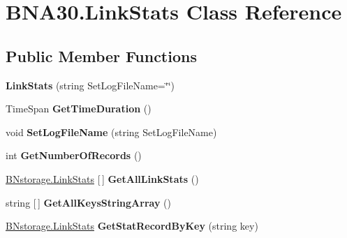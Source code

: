 \hypertarget{class_b_n_a30_1_1_link_stats}{}\section{B\+N\+A30.\+Link\+Stats Class Reference}
\label{class_b_n_a30_1_1_link_stats}
\subsection*{Public Member Functions}
\begin{DoxyCompactItemize}
\item 
\mbox{\label{class_b_n_a30_1_1_link_stats_aa33185f781bce7ea8ff35e00b918257b}} 
{\bfseries Link\+Stats} (string Set\+Log\+File\+Name=\char`\"{}\char`\"{})
\item 
\mbox{\label{class_b_n_a30_1_1_link_stats_a51be1f0cc0278b378d3a06a97797a604}} 
Time\+Span {\bfseries Get\+Time\+Duration} ()
\item 
\mbox{\label{class_b_n_a30_1_1_link_stats_a06010a1fb8bd17e45ed838d5b151811f}} 
void {\bfseries Set\+Log\+File\+Name} (string Set\+Log\+File\+Name)
\item 
\mbox{\label{class_b_n_a30_1_1_link_stats_a66dd483d693480d0370379905ce63470}} 
int {\bfseries Get\+Number\+Of\+Records} ()
\item 
\mbox{\label{class_b_n_a30_1_1_link_stats_a4c404f9dc17ea05211744aa051078184}} 
\mbox{\hyperlink{struct_b_n_a30_1_1_b_nstorage_1_1_link_stats}{B\+Nstorage.\+Link\+Stats}} \mbox{[}$\,$\mbox{]} {\bfseries Get\+All\+Link\+Stats} ()
\item 
\mbox{\label{class_b_n_a30_1_1_link_stats_aa809d05394991f3a4960eb2b78e283ad}} 
string \mbox{[}$\,$\mbox{]} {\bfseries Get\+All\+Keys\+String\+Array} ()
\item 
\mbox{\label{class_b_n_a30_1_1_link_stats_a35079815367e5a0e03d1f5a04d93a0fb}} 
\mbox{\hyperlink{struct_b_n_a30_1_1_b_nstorage_1_1_link_stats}{B\+Nstorage.\+Link\+Stats}} {\bfseries Get\+Stat\+Record\+By\+Key} (string key)

\end{DoxyCompactItemize}
